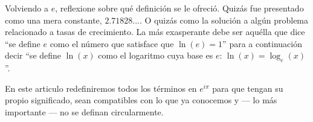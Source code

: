 Volviendo a $e$, reflexione sobre qué definición se le ofreció. Quizás fue presentado como una mera constante, $2.71828...$. O quizás como la solución a algún problema relacionado a tasas de crecimiento. La más exasperante debe ser aquélla que dice \enquote{se define $e$ como el número que satisface que $\ln(e) = 1$} para a continuación decir \enquote{se define $\ln(x)$ como el logaritmo cuya base es $e$: $\ln(x) = \log_e(x)$}.

En este articulo redefiniremos todos los términos en $e^{i\pi}$ para que tengan su propio significado, sean compatibles con lo que ya conocemos y --- lo más importante --- no se definan circularmente.

\newpage
